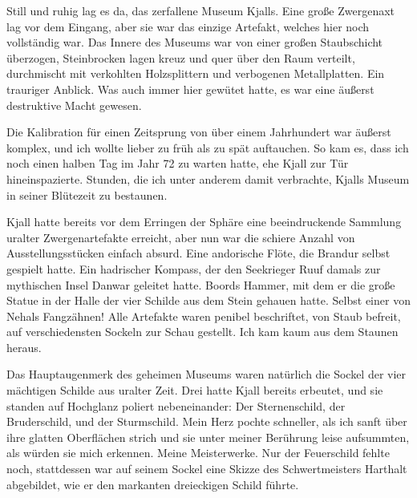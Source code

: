 Still und ruhig lag es da, das zerfallene Museum Kjalls. Eine große Zwergenaxt lag vor dem Eingang, aber sie war das einzige Artefakt, welches hier noch vollständig war. Das Innere des Museums war von einer großen Staubschicht überzogen, Steinbrocken lagen kreuz und quer über den Raum verteilt, durchmischt mit verkohlten Holzsplittern und verbogenen Metallplatten. Ein trauriger Anblick. Was auch immer hier gewütet hatte, es war eine äußerst destruktive Macht gewesen.

Die Kalibration für einen Zeitsprung von über einem Jahrhundert war äußerst komplex, und ich wollte lieber zu früh als zu spät auftauchen. So kam es, dass ich noch einen halben Tag im Jahr 72 zu warten hatte, ehe Kjall zur Tür hineinspazierte. Stunden, die ich unter anderem damit verbrachte, Kjalls Museum in seiner Blütezeit zu bestaunen.

Kjall hatte bereits vor dem Erringen der Sphäre eine beeindruckende Sammlung uralter Zwergenartefakte erreicht, aber nun war die schiere Anzahl von Ausstellungsstücken einfach absurd. Eine andorische Flöte, die Brandur selbst gespielt hatte. Ein hadrischer Kompass, der den Seekrieger Ruuf damals zur mythischen Insel Danwar geleitet hatte. Boords Hammer, mit dem er die große Statue in der Halle der vier Schilde aus dem Stein gehauen hatte. Selbst einer von Nehals Fangzähnen! Alle Artefakte waren penibel beschriftet, von Staub befreit, auf verschiedensten Sockeln zur Schau gestellt. Ich kam kaum aus dem Staunen heraus.

Das Hauptaugenmerk des geheimen Museums waren natürlich die Sockel der vier mächtigen Schilde aus uralter Zeit. Drei hatte Kjall bereits erbeutet, und sie standen auf Hochglanz poliert nebeneinander: Der Sternenschild, der Bruderschild, und der Sturmschild. Mein Herz pochte schneller, als ich sanft über ihre glatten Oberflächen strich und sie unter meiner Berührung leise aufsummten, als würden sie mich erkennen. Meine Meisterwerke. Nur der Feuerschild fehlte noch, stattdessen war auf seinem Sockel eine Skizze des Schwertmeisters Harthalt abgebildet, wie er den markanten dreieckigen Schild führte.

